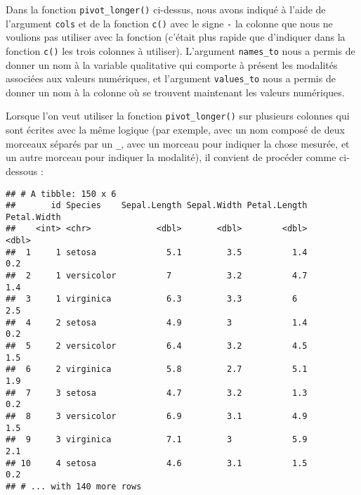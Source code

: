 \documentclass[
  french,
]{book}
\newenvironment{Shaded}{\begin{snugshade}}{\end{snugshade}}
\newcommand{\DataTypeTok}[1]{\textcolor[rgb]{0.13,0.29,0.53}{#1}}
\newcommand{\KeywordTok}[1]{\textcolor[rgb]{0.13,0.29,0.53}{\textbf{#1}}}
\newcommand{\NormalTok}[1]{#1}
\newcommand{\OperatorTok}[1]{\textcolor[rgb]{0.81,0.36,0.00}{\textbf{#1}}}
\newcommand{\StringTok}[1]{\textcolor[rgb]{0.31,0.60,0.02}{#1}}
\begin{document}
Dans la fonction \texttt{pivot\_longer()} ci-dessus, nous avons indiqué à l'aide de l'argument \texttt{cols} et de la fonction \texttt{c()} avec le signe \texttt{-} la colonne que nous ne voulions pas utiliser avec la fonction (c'était plus rapide que d'indiquer dans la fonction \texttt{c()} les trois colonnes à utiliser). L'argument \texttt{names\_to} nous a permis de donner un nom à la variable qualitative qui comporte à présent les modalités associées aux valeurs numériques, et l'argument \texttt{values\_to} nous a permis de donner un nom à la colonne où se trouvent maintenant les valeurs numériques.

Lorsque l'on veut utiliser la fonction \texttt{pivot\_longer()} sur plusieurs colonnes qui sont écrites avec la même logique (par exemple, avec un nom composé de deux morceaux séparés par un \texttt{\_}, avec un morceau pour indiquer la chose mesurée, et un autre morceau pour indiquer la modalité), il convient de procéder comme ci-dessous :

\begin{Shaded}
\end{Shaded}

\begin{verbatim}
## # A tibble: 150 x 6
##       id Species    Sepal.Length Sepal.Width Petal.Length Petal.Width
##    <int> <chr>             <dbl>       <dbl>        <dbl>       <dbl>
##  1     1 setosa              5.1         3.5          1.4         0.2
##  2     1 versicolor          7           3.2          4.7         1.4
##  3     1 virginica           6.3         3.3          6           2.5
##  4     2 setosa              4.9         3            1.4         0.2
##  5     2 versicolor          6.4         3.2          4.5         1.5
##  6     2 virginica           5.8         2.7          5.1         1.9
##  7     3 setosa              4.7         3.2          1.3         0.2
##  8     3 versicolor          6.9         3.1          4.9         1.5
##  9     3 virginica           7.1         3            5.9         2.1
## 10     4 setosa              4.6         3.1          1.5         0.2
## # ... with 140 more rows
\end{verbatim}
\end{document}
